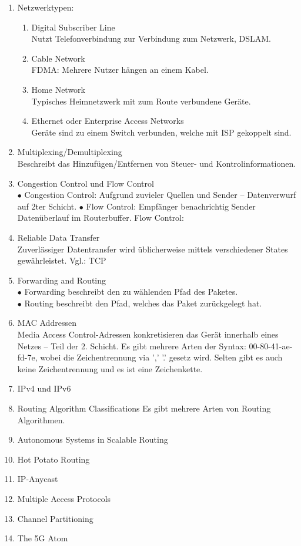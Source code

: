 \documentclass{scrartcl}
\begin{document}
\begin{enumerate}[$\bullet$]
        \item Netzwerktypen:
        \begin{enumerate}
            \item Digital Subscriber Line\\
            Nutzt Telefonverbindung zur Verbindung zum Netzwerk, DSLAM.  
            \item Cable Network\\
            FDMA: Mehrere Nutzer hängen an einem Kabel.
            \item Home Network\\
            Typisches Heimnetzwerk mit zum Route verbundene Geräte.
            \item Ethernet oder Enterprise Access Networks\\
            Geräte sind zu einem Switch verbunden, welche mit ISP gekoppelt sind. 
        \end{enumerate}
        \item Multiplexing/Demultiplexing\\
        Beschreibt das Hinzufügen/Entfernen von Steuer- und Kontrolinformationen.
        \item Congestion Control und Flow Control\\
        $\bullet$ Congestion Control: Aufgrund zuvieler Quellen und Sender -- Datenverwurf auf 2ter Schicht.
        $\bullet$ Flow Control: Empfänger benachrichtig Sender Datenüberlauf im Routerbuffer.
        Flow Control:
        \item Reliable Data Transfer\\
        Zuverlässiger Datentransfer wird üblicherweise mittels verschiedener States gewährleistet. Vgl.: TCP
        \item Forwarding and Routing\\
        $\bullet$ Forwarding beschreibt den zu wählenden Pfad des Paketes.\\
        $\bullet$ Routing beschreibt den Pfad, welches das Paket zurückgelegt hat.\\
        \item MAC Addressen \\
        Media Access Control-Adressen konkretisieren das Gerät innerhalb eines Netzes -- Teil der 2. Schicht.
        Es gibt mehrere Arten der Syntax: 00-80-41-ae-fd-7e, wobei die Zeichentrennung via ',' '.' gesetz wird. Selten gibt es auch keine Zeichentrennung und es ist eine Zeichenkette.
        \item IPv4 und IPv6
        \item Routing Algorithm Classifications
        Es gibt mehrere Arten von Routing Algorithmen.
        \item Autonomous Systems in Scalable Routing
        \item Hot Potato Routing
        \item IP-Anycast
        \item Multiple Access Protocols
        \item Channel Partitioning
        \item The 5G Atom
    \end{enumerate}
\end{document}
